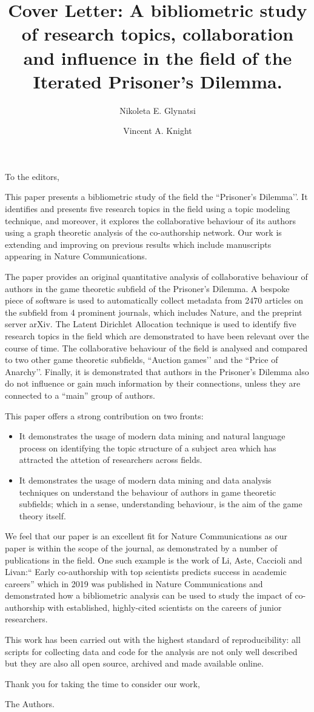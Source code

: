 \documentclass{article}
\title{Cover Letter: A bibliometric study of research topics, collaboration and
influence in the field of the Iterated Prisoner’s Dilemma.}
\author[1]{Nikoleta E. Glynatsi}
\author[1]{Vincent A. Knight}
\affil[1]{Cardiff University, School of Mathematics, Cardiff, United Kingdom}
\date{}
\begin{document}
\maketitle

To the editors,

This paper presents a bibliometric study of the field the ``Prisoner’s
Dilemma’’. It identifies and presents five research topics in the field using a
topic modeling technique, and moreover, it explores the collaborative behaviour
of its authors using a graph theoretic analysis of the co-authorship network.
Our work is extending and improving on previous results which include
manuscripts appearing in Nature Communications.

The paper provides an original quantitative analysis of collaborative behaviour
of authors in the game theoretic subfield of the Prisoner’s Dilemma. A bespoke
piece of software is used to automatically collect metadata from 2470 articles
on the subfield from 4 prominent journals, which includes Nature, and the
preprint server arXiv. The Latent Dirichlet Allocation technique is  used to
identify five research topics in the field which are demonstrated to have been
relevant over the course of time.  The collaborative behaviour of the field is
analysed and compared to two other game theoretic subfields, ``Auction games’’
and the ``Price of Anarchy’’. Finally, it is demonstrated that authors in the
Prisoner’s Dilemma also do not influence or gain much information by their connections,
unless they are connected to a ``main” group of authors.

This paper offers a strong contribution on two fronts:

\begin{itemize}
    \item It demonstrates the usage of modern data mining and natural language
    process on identifying the topic structure of a subject area which has
    attracted the attetion of researchers across fields.
    \item It demonstrates the usage of modern data mining and data analysis
    techniques on understand the behaviour of authors in game theoretic
    subfields; which in a sense, understanding behaviour, is the aim of the game
    theory itself.
\end{itemize}

We feel that our paper is an excellent fit for Nature Communications as our
paper is within the scope of the journal, as demonstrated by a number of
publications in the field. One such example is the work of Li, Aste, Caccioli
and Livan:`` Early co-authorship with top scientists predicts success
in academic careers'' which in 2019 was published in Nature Communications and
demonstrated how a bibliometric analysis can be used to study the impact of
co-authorship with established, highly-cited scientists on the careers of junior
researchers.

This work has been carried out with the highest standard of reproducibility: all
scripts for collecting data and code for the analysis are not only well
described but they are also all open source, archived and made available online.

Thank you for taking the time to consider our work,

The Authors.
\end{document}
